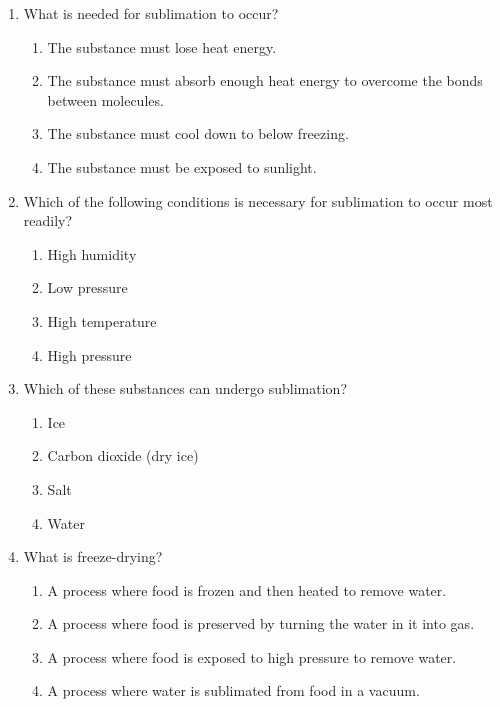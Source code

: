 \documentclass[12pt]{article}
\begin{document}
\begin{enumerate}
\vspace{0.5cm}

\item What is needed for sublimation to occur?
\begin{enumerate}[label=\Alph*.]
    \item The substance must lose heat energy.
    \item The substance must absorb enough heat energy to overcome the bonds between molecules.
    \item The substance must cool down to below freezing.
    \item The substance must be exposed to sunlight.
\end{enumerate}

\vspace{0.5cm}

\item Which of the following conditions is necessary for sublimation to occur most readily?
\begin{enumerate}[label=\Alph*.]
    \item High humidity
    \item Low pressure
    \item High temperature
    \item High pressure
\end{enumerate}

\vspace{0.5cm}

\item Which of these substances can undergo sublimation?
\begin{enumerate}[label=\Alph*.]
    \item Ice
    \item Carbon dioxide (dry ice)
    \item Salt
    \item Water
\end{enumerate}

\vspace{0.5cm}

\item What is freeze-drying?
\begin{enumerate}[label=\Alph*.]
    \item A process where food is frozen and then heated to remove water.
    \item A process where food is preserved by turning the water in it into gas.
    \item A process where food is exposed to high pressure to remove water.
    \item A process where water is sublimated from food in a vacuum.
\end{enumerate}


\end{enumerate}
\end{document}
